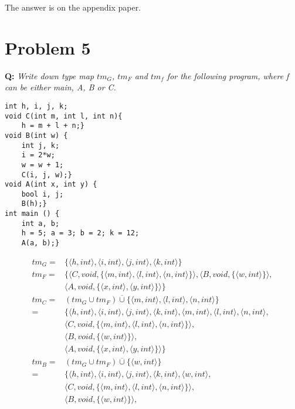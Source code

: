 \documentclass{article}
\begin{document}
The answer is on the appendix paper.

\section*{Problem 5}
\textbf{Q:} \textit{Write down type map $tm_G$, $tm_F$ and $tm_f$ for the following program, where f can be either main, A, B or C.}

\begin{lstlisting}
int h, i, j, k;
void C(int m, int l, int n){
    h = m + l + n;}
void B(int w) {
    int j, k;
    i = 2*w;
    w = w + 1;
    C(i, j, w);}
void A(int x, int y) {
    bool i, j;
    B(h);}
int main () {
    int a, b;
    h = 5; a = 3; b = 2; k = 12;
    A(a, b);}
\end{lstlisting}

\begin{align*}
tm_G = &\{\langle h, int\rangle , \langle i, int\rangle , \langle j, int\rangle , \langle k, int\rangle \} \\
tm_F = &\{\langle C, void, \{\langle m, int\rangle , \langle l, int\rangle , \langle n, int\rangle \}\rangle , \langle B, void, \{\langle w, int\rangle \}\rangle , \\
       &\langle A, void, \{\langle x, int\rangle , \langle y, int\rangle \}\rangle \} \\
tm_C = &(tm_G \cup tm_F) \overline{\cup} \{\langle m, int\rangle , \langle l, int\rangle , \langle n, int\rangle \} \\
     = &\{\langle h, int\rangle , \langle i, int\rangle , \langle j, int\rangle , \langle k, int\rangle , \langle m, int\rangle , \langle l, int\rangle , \langle n, int\rangle , \\
       &\langle C, void, \{\langle m, int\rangle , \langle l, int\rangle , \langle n, int\rangle \}\rangle , \\
       &\langle B, void, \{\langle w, int\rangle \}\rangle , \\
       &\langle A, void, \{\langle x, int\rangle , \langle y, int\rangle \}\rangle \} \\
tm_B = &(tm_G \cup tm_F) \overline{\cup} \{\langle w, int\rangle \} \\
     = &\{\langle h, int\rangle , \langle i, int\rangle , \langle j, int\rangle , \langle k, int\rangle , \langle w, int\rangle , \\
       &\langle C, void, \{\langle m, int\rangle , \langle l, int\rangle , \langle n, int\rangle \}\rangle , \\
       &\langle B, void, \{\langle w, int\rangle \}\rangle , \\

\end{align*}
\end{document}
